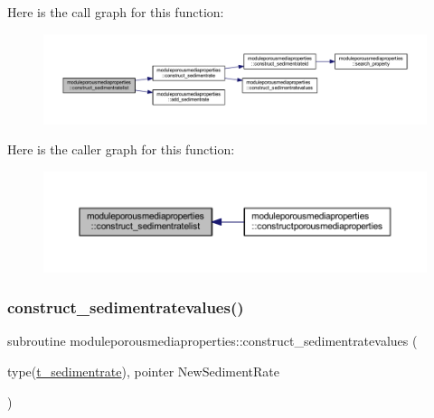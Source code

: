 Here is the call graph for this function\+:\nopagebreak
\begin{figure}[H]
\begin{center}
\leavevmode
\includegraphics[width=350pt]{namespacemoduleporousmediaproperties_acc3491b7ab1e55b078caa370b4c75601_cgraph}
\end{center}
\end{figure}
Here is the caller graph for this function\+:\nopagebreak
\begin{figure}[H]
\begin{center}
\leavevmode
\includegraphics[width=350pt]{namespacemoduleporousmediaproperties_acc3491b7ab1e55b078caa370b4c75601_icgraph}
\end{center}
\end{figure}
\mbox{\label{namespacemoduleporousmediaproperties_a38a540abbf59777875ca535ba0683c59}} 
\subsubsection{\texorpdfstring{construct\+\_\+sedimentratevalues()}{construct\_sedimentratevalues()}}
{\footnotesize\ttfamily subroutine moduleporousmediaproperties\+::construct\+\_\+sedimentratevalues (\begin{DoxyParamCaption}\item[{type(\mbox{\hyperlink{structmoduleporousmediaproperties_1_1t__sedimentrate}{t\+\_\+sedimentrate}}), pointer}]{New\+Sediment\+Rate }\end{DoxyParamCaption})\hspace{0.3cm}{\ttfamily [private]}}

